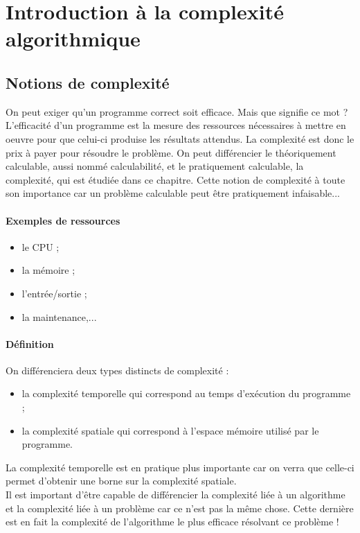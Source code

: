 
\chapter{Introduction à la complexité algorithmique}
\label{sec:complexit_}
\section{Notions de complexité}
On peut exiger qu'un programme correct soit efficace. Mais que signifie ce mot ?
L'efficacité d'un programme est la mesure des ressources nécessaires à mettre en oeuvre pour que celui-ci produise les résultats attendus.
La complexité est donc le prix à payer pour résoudre le problème. On peut différencier le théoriquement calculable, aussi nommé calculabilité, et le pratiquement calculable, la complexité, qui est étudiée dans ce chapitre.
Cette notion de complexité à toute son importance car un problème calculable peut être pratiquement infaisable...

\subsubsection{Exemples de ressources}
\begin{itemize}
\item le CPU ;
\item la mémoire ;
\item l'entrée/sortie ;
\item la maintenance,...
\end{itemize}


\subsubsection{Définition}
On différenciera deux types distincts de complexité :
\begin{itemize}
\item la complexité temporelle qui correspond au temps d'exécution du programme ;
\item la complexité spatiale qui correspond à l'espace mémoire utilisé par le programme.
\end{itemize}
La complexité temporelle est en pratique plus importante car on verra que celle-ci permet d'obtenir une borne sur la complexité spatiale. \\

Il est important d'être capable de différencier la complexité liée à un algorithme et la complexité liée à un problème car ce n'est pas la même chose. Cette dernière est en fait la complexité de l'algorithme le plus efficace résolvant ce problème !\\

